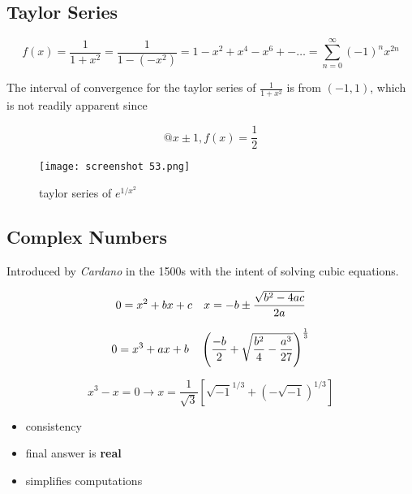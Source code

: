 \documentclass[svgnames]{article}   	%
\begin{document}
\subsection{Taylor Series}

\[
f(x) = \frac{1}{1+x^2} = \frac{1}{1-(-x^2)} = 1 - x^2 + x^4 - x^6 + - \dots
= \sum_{n=0}^{\infty} (-1)^n x^{2n}
\]

The interval of convergence for the taylor series of $\frac{1}{1+x^2}$ is from
$(-1,1)$, which is not readily apparent since 

 \[
@x \pm 1, f(x) = \frac{1}{2}
\]


\begin{figure}[H]
  \centering
    \texttt{[image: screenshot 53.png]}
    \caption{taylor series of $e^{1/x^2}$}
\end{figure}



\subsection{Complex Numbers}

Introduced by \textit{Cardano} in the 1500s with the intent of solving cubic
equations.

\begin{tcolorbox}[colback = red!5!white, colframe = red!50!black, title
  = Quadratic Equations]
  
  \[
  0 = x^2 + bx + c \hspace{10px} x = -b \pm \frac{ \sqrt{b^2 - 4ac}}{2a}
  \]
\end{tcolorbox}

\begin{tcolorbox}[colback = blue!5!white, colframe = blue!50!black, title
  = Cubic Equations]
  \[
  0 = x^3 + ax + b \hspace{10px} \left(\frac{-b}{2} + \sqrt{\frac{b^2}{4}
  - \frac{a^3}{27}}\right)^{\frac{1}{3}}
  \]

  \[
    x^3 - x = 0 \rightarrow x = \frac{1}{ \sqrt{3}}\left[\sqrt{-1}^{1/3}
    + (-\sqrt{-1})^{1/3} \right]
  \]
  \begin{itemize}
    \item consistency
    \item final answer is \textbf{real}
    \item simplifies computations
  \end{itemize}  
  
\end{tcolorbox}
\end{document}
